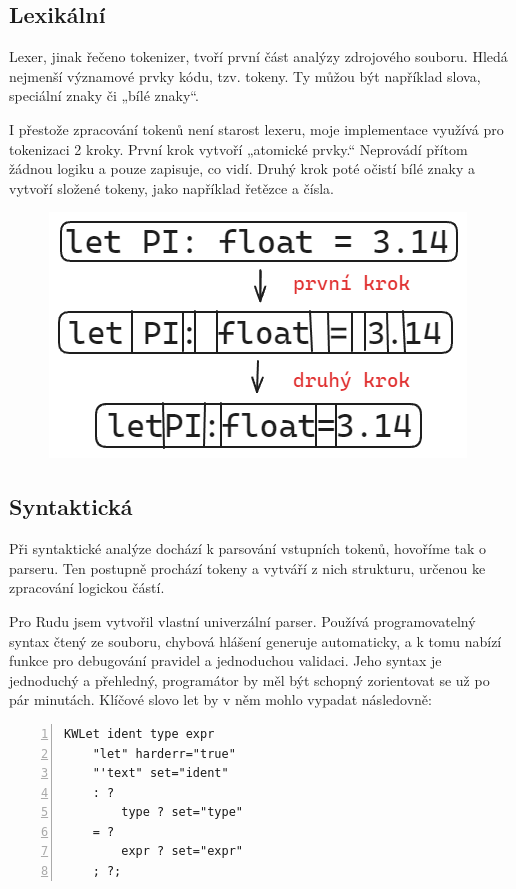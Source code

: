 \documentclass[12pt, a4paper,
twoside,        %
openright
]{report}
\begin{document}
\subsection{Lexikální}

Lexer, jinak řečeno tokenizer, tvoří první část analýzy zdrojového souboru. Hledá nejmenší významové prvky kódu, tzv. tokeny. Ty můžou být například slova, speciální znaky či „bílé znaky“.

I přestože zpracování tokenů není starost lexeru, moje implementace využívá pro tokenizaci 2 kroky. První krok vytvoří „atomické prvky.“ Neprovádí přítom žádnou logiku a pouze zapisuje, co vidí. Druhý krok poté očistí bílé znaky a vytvoří složené tokeny, jako například řetězce a čísla.

\begin{figure}[h]
	\centering
	\includegraphics[width=0.5\linewidth]{image/lexer.png}
\end{figure}

\subsection{Syntaktická}

Při syntaktické analýze dochází k parsování vstupních tokenů, hovoříme tak o parseru. Ten postupně prochází tokeny a vytváří z nich strukturu, určenou ke zpracování logickou částí.

Pro Rudu jsem vytvořil vlastní univerzální parser. Používá programovatelný syntax čtený ze souboru, chybová hlášení generuje automaticky, a k tomu nabízí funkce pro debugování pravidel a jednoduchou validaci. Jeho syntax je jednoduchý a přehledný, programátor by měl být schopný zorientovat se už po pár minutách. Klíčové slovo let by v něm mohlo vypadat následovně:

\begin{lstlisting}[numbers=left, caption={Ukázka klíčového slova let}]
KWLet ident type expr
	"let" harderr="true"
	"'text" set="ident"
	: ?
		type ? set="type"
	= ?
		expr ? set="expr"
	; ?;
\end{lstlisting}
\end{document}
